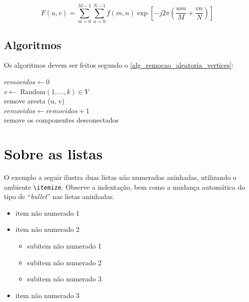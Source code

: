 \begin{apendicesenv}
    \begin{equation}
        F(u, v) = \sum_{m = 0}^{M - 1} \sum_{n = 0}^{N - 1} f(m, n) \exp \left[ -j 2 \pi \left( \frac{u m}{M} + \frac{v n}{N} \right) \right]
        \label{eq_dft}
    \end{equation}

    \section{Algoritmos}
    \label{sec_algoritmos}

    Os  algoritmos devem ser feitos segundo o \autoref{alg_remocao_aleatoria_vertices}:

    \begin{algorithm}
        \caption{Algoritmo para remoção aleatória de vértices}
        \label{alg_remocao_aleatoria_vertices}

        $removidos \leftarrow 0$ \\
         {
            $v \leftarrow$ Random$(1, ..., k) \in V$ \\
             {
                remove aresta (u, v)\\
                $removidos \leftarrow removidos + 1$\\
            }
             {
                remove os componentes desconectados\\
            }
        }
    \end{algorithm}


    \chapter{Sobre as listas}
    \label{chap_sobre_as_listas}

    O exemplo a seguir ilustra duas listas não numeradas aninhadas, utilizando o ambiente \verb|\itemize|.
    Observe a indentação, bem como a mudança automática do tipo de ``\textit{bullet}'' nas listas aninhadas.

    \begin{itemize}
        \item item não numerado 1
        \item item não numerado 2
              \begin{itemize}
                  \item subitem não numerado 1
                  \item subitem não numerado 2
                  \item subitem não numerado 3
              \end{itemize}
        \item item não numerado 3
    \end{itemize}


\end{apendicesenv}
